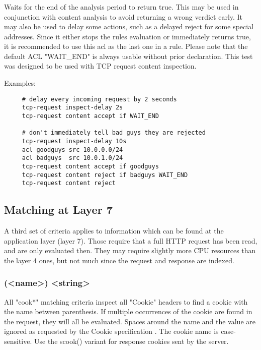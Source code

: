 \subsubsection[wait\_end]{}

  Waits for the end of the analysis period to return true. This may be used in
  conjunction with content analysis to avoid returning a wrong verdict early.
  It may also be used to delay some actions, such as a delayed reject for some
  special addresses. Since it either stops the rules evaluation or immediately
  returns true, it is recommended to use this acl as the last one in a rule.
  Please note that the default ACL "WAIT\_END" is always usable without prior
  declaration. This test was designed to be used with TCP request content
  inspection.

  Examples:
  \begin{verbatim}
     # delay every incoming request by 2 seconds
     tcp-request inspect-delay 2s
     tcp-request content accept if WAIT_END

     # don't immediately tell bad guys they are rejected
     tcp-request inspect-delay 10s
     acl goodguys src 10.0.0.0/24
     acl badguys  src 10.0.1.0/24
     tcp-request content accept if goodguys
     tcp-request content reject if badguys WAIT_END
     tcp-request content reject
  \end{verbatim}

\subsection{Matching at Layer 7}
\label{subsec:matching_level7}

A third set of criteria applies to information which can be found at the
application layer (layer 7). Those require that a full HTTP request has been
read, and are only evaluated then. They may require slightly more CPU resources
than the layer 4 ones, but not much since the request and response are indexed.

\subsubsection[cook]{(<name>) <string>}

  All "cook*" matching criteria inspect all "Cookie" headers to find a cookie
  with the name between parenthesis. If multiple occurrences of the cookie are
  found in the request, they will all be evaluated. Spaces around the name and
  the value are ignored as requested by the Cookie specification . The
  cookie name is case-sensitive. Use the scook() variant for response cookies
  sent by the server.

